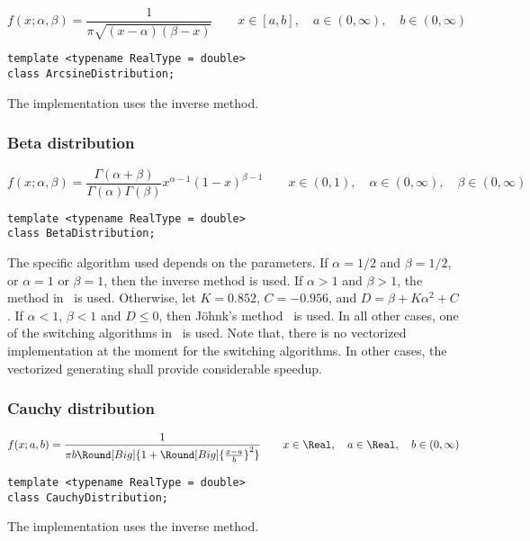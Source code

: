 \begin{equation*}
  f(x;\alpha,\beta) = \frac{1}{\pi\sqrt{(x - \alpha)(\beta - x)}} \qquad
  x \in [a, b],\quad a \in (0,\infty),\quad b \in (0,\infty)
\end{equation*}
\begin{Verbatim}
template <typename RealType = double>
class ArcsineDistribution;
\end{Verbatim}
The implementation uses the inverse method.

\subsubsection{Beta distribution}

\begin{equation*}
  f(x;\alpha,\beta) =
  \frac{\Gamma(\alpha + \beta)}{\Gamma(\alpha)\Gamma(\beta)}
  x^{\alpha - 1}(1 - x)^{\beta - 1} \qquad
  x \in (0, 1),\quad \alpha \in (0,\infty),\quad \beta \in (0,\infty)
\end{equation*}
\begin{Verbatim}
template <typename RealType = double>
class BetaDistribution;
\end{Verbatim}
The specific algorithm used depends on the parameters. If $\alpha = 1/2$ and
$\beta = 1/2$, or $\alpha = 1$ or $\beta = 1$, then the inverse method is used.
If $\alpha > 1$ and $\beta > 1$, the method in~\cite{Cheng:1978jl} is used.
Otherwise, let $K = 0.852$, $C = -0.956$, and $D = \beta + K\alpha^2 + C$. If
$\alpha < 1$, $\beta < 1$ and $D \le 0$, then Jöhnk's
method~\cite[sec.~3.5]{Devroye:1986gi} is used. In all other cases, one of the
switching algorithms in~\cite{Atkinson:1979es} is used. Note that, there is no
vectorized implementation at the moment for the switching algorithms. In other
cases, the vectorized generating shall provide considerable speedup.

\subsubsection{Cauchy distribution}

\begin{equation*}
  f(x;a,b) =
  \frac{1}{\pi b\Round[Big]{1 + \Round[Big]{\frac{x - a}{b}}^2}} \qquad
  x \in \Real,\quad a \in \Real,\quad b \in (0,\infty)
\end{equation*}
\begin{Verbatim}
template <typename RealType = double>
class CauchyDistribution;
\end{Verbatim}
The implementation uses the inverse method.

